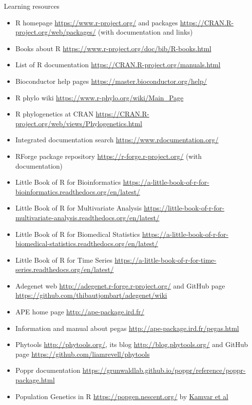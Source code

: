 \documentclass[compress, ucs, xelatex, 11pt, xcolor=svgnames, aspectratio=169,
	hyperref={
		bookmarks=true,
		unicode=true,
		colorlinks=true,
		pdftitle={Molecular data in R},
		plainpages=false,
		pdfauthor={Vojtech Zeisek},
		pdfsubject={Course about phylogeny and evolution in R},
		pdfcreator={XeLaTeX},
		pdfkeywords={R, evolution, phylogeny, molecular data},
		linkcolor=Crimson, %
		anchorcolor=Magenta, %
		citecolor=Magenta, %
		filecolor=Magenta, %
		menucolor=Magenta, %
		urlcolor=DodgerBlue, %
		pdftex},
	url={hyphens, lowtilde} %
	]{beamer}
\begin{document}
\begin{frame}[allowframebreaks]{Learning resources}
	\begin{itemize}
		\item R homepage \url{https://www.r-project.org/} and packages \url{https://CRAN.R-project.org/web/packages/} (with documentation and links)
		\item Books about R \url{https://www.r-project.org/doc/bib/R-books.html}
		\item List of R documentation \url{https://CRAN.R-project.org/manuals.html}
		\item Bioconductor help pages \url{https://master.bioconductor.org/help/}
		\item R phylo wiki \url{https://www.r-phylo.org/wiki/Main_Page}
		\item R phylogenetics at CRAN \url{https://CRAN.R-project.org/web/views/Phylogenetics.html}
		\item Integrated documentation search \url{https://www.rdocumentation.org/}
		\item RForge package repository \url{https://r-forge.r-project.org/} (with documentation)
		\item Little Book of R for Bioinformatics \url{https://a-little-book-of-r-for-bioinformatics.readthedocs.org/en/latest/}
		\item Little Book of R for Multivariate Analysis \url{https://little-book-of-r-for-multivariate-analysis.readthedocs.org/en/latest/}
		\item Little Book of R for Biomedical Statistics \url{https://a-little-book-of-r-for-biomedical-statistics.readthedocs.org/en/latest/}
		\item Little Book of R for Time Series \url{https://a-little-book-of-r-for-time-series.readthedocs.org/en/latest/}
		\item Adegenet web \url{http://adegenet.r-forge.r-project.org/} and GitHub page \url{https://github.com/thibautjombart/adegenet/wiki}
		\item APE home page \url{http://ape-package.ird.fr/}
		\item Information and manual about pegas \url{http://ape-package.ird.fr/pegas.html}
		\item Phytools \url{http://phytools.org/}, its blog \url{http://blog.phytools.org/} and GitHub page \url{https://github.com/liamrevell/phytools}
		\item Poppr documentation \url{https://grunwaldlab.github.io/poppr/reference/poppr-package.html}
		\item Population Genetics in R \url{https://popgen.nescent.org/} by \href{https://onlinelibrary.wiley.com/doi/full/10.1111/1755-0998.12558}{Kamvar et al}

\end{itemize}
\end{frame}
\end{document}
